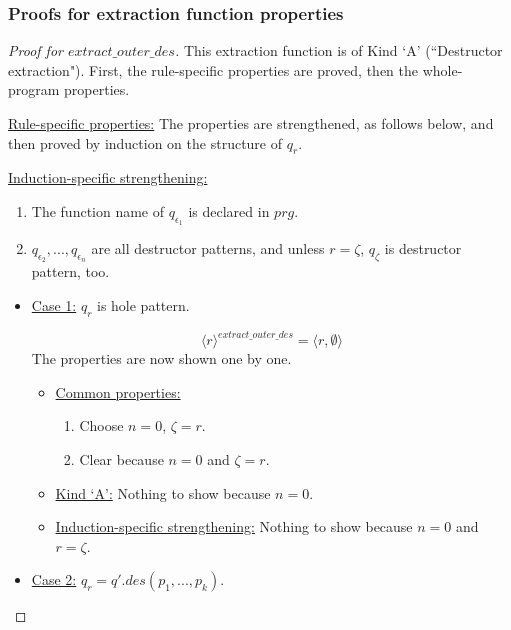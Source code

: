 \documentclass[11pt]{article} %
\begin{document}
\subsubsection{Proofs for extraction function properties}

\begin{proof}[Proof for $extract\_outer\_des$]

This extraction function is of Kind `A' (``Destructor extraction"). First, the rule-specific properties are proved, then the whole-program properties.

\underline{Rule-specific properties:} The properties are strengthened, as follows below, and then proved by induction on the structure of $q_r$.

\underline{Induction-specific strengthening:}
\begin{enumerate}
\item The function name of $q_{\epsilon_1}$ is declared in $prg$.
\item $q_{\epsilon_2}, ..., q_{\epsilon_n}$ are all destructor patterns, and unless $r = \zeta$, $q_\zeta$ is destructor pattern, too.
\end{enumerate}

\begin{itemize}

\item \underline{Case 1:} $q_r$ is hole pattern.

\begin{equation*}
\langle r \rangle^{extract\_outer\_des} = \big\langle r, \emptyset \big\rangle
\end{equation*}
The properties are now shown one by one.
\begin{itemize}
\item \underline{Common properties:}
\begin{enumerate}
\item Choose $n = 0$, $\zeta = r$.
\item Clear because $n = 0$ and $\zeta = r$.
\end{enumerate}

\item \underline{Kind `A':} Nothing to show because $n = 0$.

\item \underline{Induction-specific strengthening:} Nothing to show because $n = 0$ and $r = \zeta$.
\end{itemize}

\item \underline{Case 2:} $q_r = q'.des(p_1, ..., p_k)$.


\end{itemize}
\end{proof}
\end{document}
